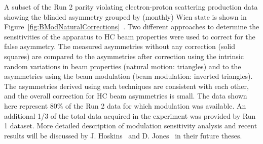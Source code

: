 A subset of the Run 2 parity violating electron-proton scattering production data showing the blinded asymmetry grouped by (monthly) Wien state is shown in Figure~\ref{fig:BModNaturalCorrections}~\cite{Allison:2014tpu}. Two different approaches to determine the sensitivities of the apparatus to HC beam properties were used to correct for the false asymmetry. The measured asymmetries without any correction (solid squares) are compared to the asymmetries after correction using the intrinsic random variations in beam properties (natural motion: triangles) and to the asymmetries using the beam modulation (beam modulation: inverted triangles). The asymmetries derived using each techniques are consistent with each other, and the overall correction for HC beam asymmetries is small. The data shown here represent 80\% of the Run 2 data for which modulation was available. %
An additional 1/3 of the total data acquired in the experiment was provided by Run 1 dataset. 
More detailed description of modulation sensitivity analysis and recent results will be discussed by J. Hoskins~\cite{jhoskins_thesis} and D. Jones~\cite{don_thesis} in their future theses.


